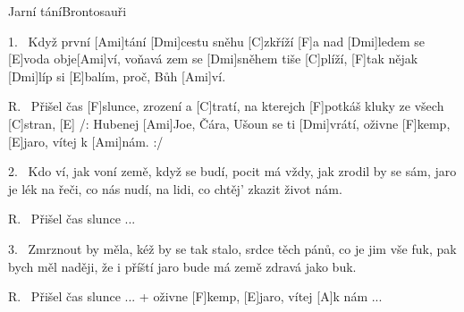 \begin{song}{Jarní tání}{Brontosauři}

\begin{xverse}{1.~}
Když první [\large Ami]tání [\large Dmi]cestu sněhu [\large C]zkříží
[\large F]a nad [\large Dmi]ledem se [\large E]voda obje[\large Ami]ví,
voňavá zem se [\large Dmi]sněhem tiše [\large C]plíží,
[\large F]tak nějak [\large Dmi]líp si [\large E]balím, proč, Bůh [\large Ami]ví.
\end{xverse}

\begin{xverse}{R.~}
Přišel čas [\large F]slunce, zrození a [\large C]tratí,
na kterejch [\large F]potkáš kluky ze všech [\large C]stran, [\large E]{}
/: Hubenej [\large Ami]Joe, Čára, Ušoun se ti [\large Dmi]vrátí,
oživne [\large F]kemp, [\large E]jaro, vítej k [\large Ami]nám. :/
\end{xverse}

\begin{xverse}{2.~}
Kdo ví, jak voní země, když se budí,
pocit má vždy, jak zrodil by se sám,
jaro je lék na řeči, co nás nudí,
na lidi, co chtěj' zkazit život nám.
\end{xverse}

\begin{xverse}{R.~}
Přišel čas slunce ...
\end{xverse}

\begin{xverse}{3.~}
Zmrznout by měla, kéž by se tak stalo,
srdce těch pánů, co je jim vše fuk,
pak bych měl naději, že i příští jaro
bude má země zdravá jako buk.
\end{xverse}

\begin{xverse}{R.~}
Přišel čas slunce ...
+ oživne [\large F]kemp, [\large E]jaro, vítej [\large A]k nám ...
\end{xverse}

\end{song}

